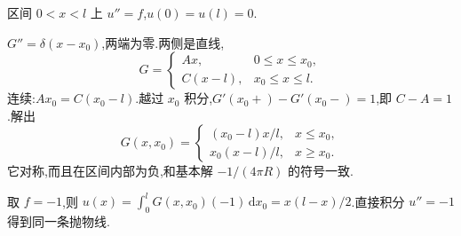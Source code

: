 \begin{example}
区间 $0<x<l$ 上 $u''=f$,$u(0)=u(l)=0$.
\end{example}
\begin{solution}
$G''=\delta(x-x_0)$,两端为零.两侧是直线,
\begin{equation}
  G=
  \begin{cases}
    A x, & 0\leq x\leq x_0, \\
    C(x-l), & x_0\leq x\leq l.
  \end{cases}
\end{equation}
连续:$A x_0=C(x_0-l)$.越过 $x_0$ 积分,$G'(x_0+)-G'(x_0-)=1$,即 $C-A=1$.解出
\begin{equation}
  G(x,x_0)=
  \begin{cases}
    (x_0-l)x/l, & x\leq x_0, \\
    x_0(x-l)/l, & x\geq x_0.
  \end{cases}
  \label{eq:gf-1d}
\end{equation}
它对称,而且在区间内部为负,和基本解 $-1/(4\pi R)$ 的符号一致.

取 $f=-1$,则 $u(x)=\int_0^l G(x,x_0)(-1)\,\mathrm{d}x_0=x(l-x)/2$.直接积分 $u''=-1$ 得到同一条抛物线.
\end{solution}
